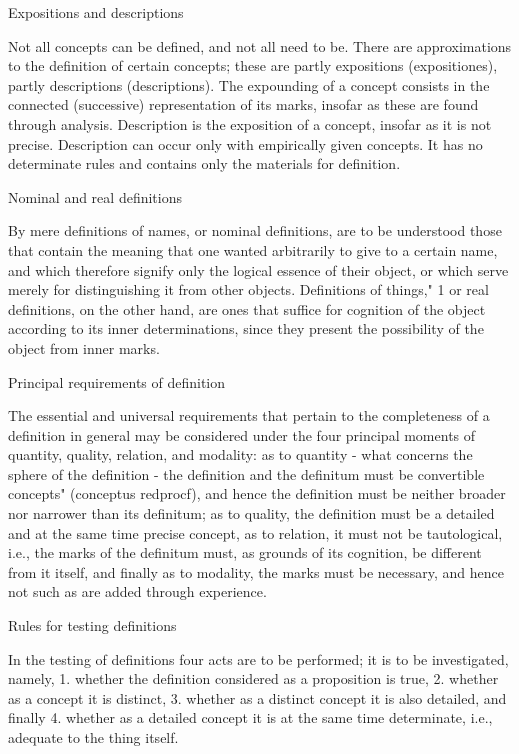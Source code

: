     Expositions and descriptions

    Not all concepts can be defined, and not all need to be.
    There are approximations to the definition of certain concepts;
    these are partly expositions (expositiones), partly descriptions (descriptions).
    The expounding of a concept consists in the connected (successive)
    representation of its marks, insofar as these are found through analysis.
    Description is the exposition of a concept, insofar as it is not precise.
    Description can occur only with empirically given concepts. It has no
    determinate rules and contains only the materials for definition.

    Nominal and real definitions

    By mere definitions of names, or nominal definitions, are to be understood
    those that contain the meaning that one wanted arbitrarily to give to a
    certain name, and which therefore signify only the logical essence of their
    object, or which serve merely for distinguishing it from other objects.
    Definitions of things," 1 or real definitions, on the other hand, are ones that
    suffice for cognition of the object according to its inner determinations,
    since they present the possibility of the object from inner marks.

    Principal requirements of definition

    The essential and universal requirements that pertain to the completeness
    of a definition in general may be considered under the four principal
    moments of quantity, quality, relation, and modality:
    as to quantity - what concerns the sphere of the definition - the definition
    and the definitum must be convertible concepts" (conceptus redprocf), and hence
    the definition must be neither broader nor narrower than its definitum;
    as to quality, the definition must be
    a detailed and at the same time precise concept,
    as to relation, it must not be tautological,
    i.e., the marks of the definitum must, as grounds of its cognition,
    be different from it itself, and finally
    as to modality, the marks must be necessary, and
    hence not such as are added through experience.

    Rules for testing definitions

    In the testing of definitions four acts are to be performed;
    it is to be investigated, namely,
    1. whether the definition considered as a proposition is true,
    2. whether as a concept it is distinct,
    3. whether as a distinct concept it is also detailed, and finally
    4. whether as a detailed concept it is at the same time determinate,
    i.e., adequate to the thing itself.

